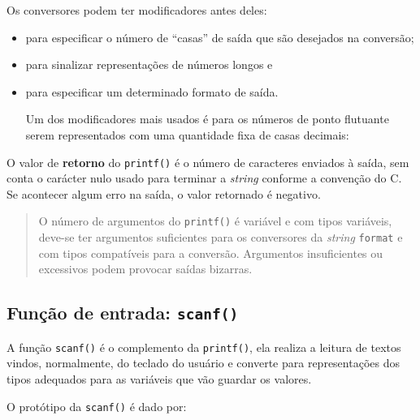 \documentclass[
]{article}
\newenvironment{Shaded}{}{}
\newcommand{\CommentTok}[1]{\textcolor[rgb]{0.38,0.63,0.69}{\textit{#1}}}
\newcommand{\FloatTok}[1]{\textcolor[rgb]{0.25,0.63,0.44}{#1}}
\newcommand{\NormalTok}[1]{#1}
\newcommand{\SpecialCharTok}[1]{\textcolor[rgb]{0.25,0.44,0.63}{#1}}
\newcommand{\StringTok}[1]{\textcolor[rgb]{0.25,0.44,0.63}{#1}}
\begin{document}
Os conversores podem ter modificadores antes deles:

\begin{itemize}
\item
  para especificar o número de ``casas'' de saída que são desejados na
  conversão;
\item
  para sinalizar representações de números longos e
\item
  para especificar um determinado formato de saída.

  Um dos modificadores mais usados é para os números de ponto flutuante
  serem representados com uma quantidade fixa de casas decimais:
\end{itemize}

\begin{Shaded}
\end{Shaded}

O valor de \textbf{retorno} do \texttt{printf()} é o número de
caracteres enviados à saída, sem conta o carácter nulo usado para
terminar a \emph{string} conforme a convenção do C. Se acontecer algum
erro na saída, o valor retornado é negativo.

\begin{quote}
O número de argumentos do \texttt{printf()} é variável e com tipos
variáveis, deve-se ter argumentos suficientes para os conversores da
\emph{string} \texttt{format} e com tipos compatíveis para a conversão.
Argumentos insuficientes ou excessivos podem provocar saídas bizarras.
\end{quote}

\hypertarget{funuxe7uxe3o-de-entrada-scanf}{%
\subsection{\texorpdfstring{Função de entrada:
\texttt{scanf()}}{Função de entrada: scanf()}}\label{funuxe7uxe3o-de-entrada-scanf}}

A função \texttt{scanf()} é o complemento da \texttt{printf()}, ela
realiza a leitura de textos vindos, normalmente, do teclado do usuário e
converte para representações dos tipos adequados para as variáveis que
vão guardar os valores.

O protótipo da \texttt{scanf()} é dado por:
\end{document}
